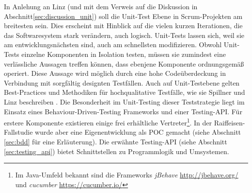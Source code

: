 In Anlehung an Linz \cite{linz_testing_2014} (und mit dem Verweis auf die Diskussion in Abschnitt\ref{sec:discussion_unit}) soll die Unit-Test Ebene in Scrum-Projekten am breitesten sein. Dies erscheint mit Hinblick auf die vielen kurzen Iterationen, die das Softwaresystem stark verändern, auch logisch. Unit-Tests lassen sich, weil sie am entwicklungsnächsten sind, auch am schnellsten modifizieren. Obwohl Unit-Tests einzelne Komponenten in Isolation testen, müssen sie zumindest eine verlässliche Aussagen treffen können, dass ebenjene Komponente ordnungsgemäß operiert. Diese Aussage wird möglich durch eine hohe Codeüberdeckung in Verbindung mit sorgfältig designten Testfällen. Auch auf Unit-Testebene gelten Best-Practices und Methodiken für hochqualitative Testfälle, wie sie Spillner und Linz beschreiben \cite{spillner_software_2014}. Die Besonderheit im Unit-Testing dieser Teststrategie liegt im Einsatz eines Behaviour-Driven-Testing \cite{chelimsky_rspec_2010} Frameworks und einer Testing-API. Für erstere Komponente existieren einige frei erhältliche Vertreter\footnote{Im Java-Umfeld bekannt sind die Frameworks \textit{jBehave} \url{http://jbehave.org/} und \textit{cucumber} \url{https://cucumber.io/}}. In der Raiffeisen-Fallstudie wurde aber eine Eigenentwicklung als \Gls{POC} gemacht (siehe Abschnitt \ref{sec:bdd} für eine Erläuterung). Die erwähnte Testing-API (siehe Abschnitt \ref{sec:testing_api}) bietet Schnittstellen zu Programmlogik und Umsystemen.\\
